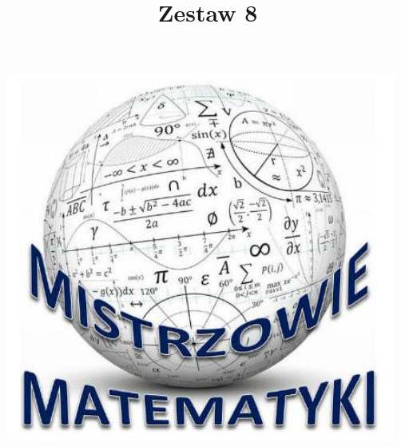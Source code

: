 \documentclass[10pt]{article}
\title{Zestaw 8 }
\author{}
\date{}
\begin{document}
\maketitle
\begin{center}
\includegraphics[max width=\textwidth]{2024_11_21_0d7cf2565ddbbb75f0d2g-1(1)}
\end{center}
\end{document}
